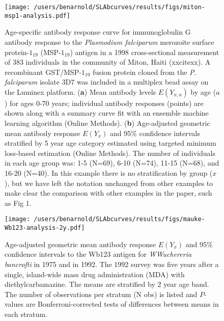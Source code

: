\documentclass[11pt]{article}
\begin{document}
\clearpage
\begin{figure}[htbp]
\begin{center}
\texttt{[image: /users/benarnold/SLAbcurves/results/figs/miton-msp1-analysis.pdf]}
\begin{minipage}{\textwidth}
\caption{Age-specific antibody response curve for immunoglobulin G antibody response to the \textit{Plasmodium falciparum} merozoite surface protein-$1_{19}$ (MSP-$1_{19}$) antigen in a 1998 cross-sectional measurement of 383 individuals in the community of Miton, Haiti (xxcitexx). A recombinant GST/MSP-$1_{19}$ fusion protein cloned from the \textit{P. falciparum} isolate 3D7 was included in a multiplex bead assay on the Luminex platform. (\textbf{a}) Mean antibody levels $E(Y_{x,a})$ by age ($a$) for ages 0-70 years; individual antibody responses (points) are shown along with a summary curve fit with an ensemble machine learning algorithm (Online Methods). (\textbf{b}) Age-adjusted geometric mean antibody response $E(Y_{x})$ and 95\% confidence intervals stratified by 5 year age category estimated using targeted minimum loss-based estimation (Online Methods). The number of individuals in each age group was: 1-5 (N=69), 6-10 (N=74), 11-15 (N=68), and 16-20 (N=40). In this example there is no stratification by group ($x$), but we have left the notation unchanged from other examples to make clear the comparison with other examples in the paper, such as Fig 1.}
\label{fig:mitonEYxa}
\end{minipage}
\end{center}
\end{figure}

\begin{figure}[htbp]
\begin{center}
\texttt{[image: /users/benarnold/SLAbcurves/results/figs/mauke-Wb123-analysis-2y.pdf]}
\begin{minipage}{0.75\textwidth}
\caption{Age-adjusted geometric mean antibody response $E(Y_{x})$ and 95\% confidence intervals to the Wb123 antigen for \textit{WWuchereria bancrofti} in 1975 and in 1992. The 1992 survey was five years after a single, island-wide mass drug administration (MDA) with diethylcarbamazine. The means are stratified by 2 year age band. The number of observations per stratum (N obs) is listed and $P$-values are Bonferroni-corrected tests of differences between means in each stratum.}
\label{fig:maukeS4}
\end{minipage}
\end{center}
\end{figure}
\end{document}
